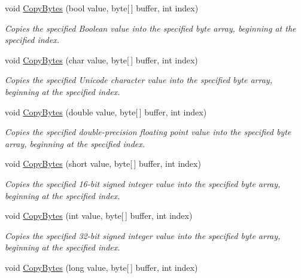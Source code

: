 \begin{DoxyCompactItemize}
void \mbox{\hyperlink{class_t_net_1_1_i_o_1_1_endian_bit_converter_aabd4e9d09948e7f5667c280f0bb91745}{Copy\+Bytes}} (bool value, byte\mbox{[}$\,$\mbox{]} buffer, int index)
\begin{DoxyCompactList}\small\item\em Copies the specified Boolean value into the specified byte array, beginning at the specified index. \end{DoxyCompactList}\item 
void \mbox{\hyperlink{class_t_net_1_1_i_o_1_1_endian_bit_converter_acfd471d62606de630af7176edc57e87d}{Copy\+Bytes}} (char value, byte\mbox{[}$\,$\mbox{]} buffer, int index)
\begin{DoxyCompactList}\small\item\em Copies the specified Unicode character value into the specified byte array, beginning at the specified index. \end{DoxyCompactList}\item 
void \mbox{\hyperlink{class_t_net_1_1_i_o_1_1_endian_bit_converter_ac357c85d1176552db3a01319796daf7d}{Copy\+Bytes}} (double value, byte\mbox{[}$\,$\mbox{]} buffer, int index)
\begin{DoxyCompactList}\small\item\em Copies the specified double-\/precision floating point value into the specified byte array, beginning at the specified index. \end{DoxyCompactList}\item 
void \mbox{\hyperlink{class_t_net_1_1_i_o_1_1_endian_bit_converter_aecab93faaa77e19225d89b3119d2950a}{Copy\+Bytes}} (short value, byte\mbox{[}$\,$\mbox{]} buffer, int index)
\begin{DoxyCompactList}\small\item\em Copies the specified 16-\/bit signed integer value into the specified byte array, beginning at the specified index. \end{DoxyCompactList}\item 
void \mbox{\hyperlink{class_t_net_1_1_i_o_1_1_endian_bit_converter_a307e58b3ceaddfcfd5012135fdd3e127}{Copy\+Bytes}} (int value, byte\mbox{[}$\,$\mbox{]} buffer, int index)
\begin{DoxyCompactList}\small\item\em Copies the specified 32-\/bit signed integer value into the specified byte array, beginning at the specified index. \end{DoxyCompactList}\item 
void \mbox{\hyperlink{class_t_net_1_1_i_o_1_1_endian_bit_converter_af64c0714e7650f5be17e9e4fe886459c}{Copy\+Bytes}} (long value, byte\mbox{[}$\,$\mbox{]} buffer, int index)

\end{DoxyCompactItemize}
